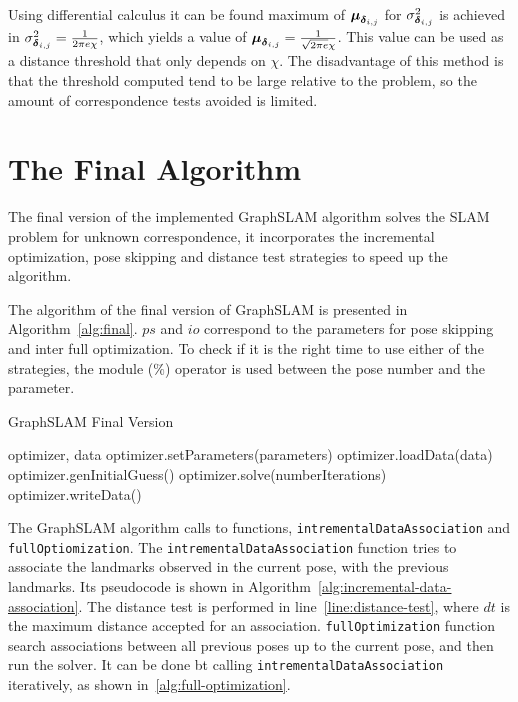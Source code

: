 Using differential calculus it can be found maximum of $\boldsymbol{\mu}_{\boldsymbol{\delta}_{i,j}}$ for $\sigma_{\boldsymbol{\delta}_{i,j}}^2$ is achieved in $\sigma_{\boldsymbol{\delta}_{i,j}}^2 = \frac{1}{2\pi e\chi}$, which yields a value of $\boldsymbol{\mu}_{\boldsymbol{\delta}_{i,j}} = \frac{1}{\sqrt{2\pi e}\chi}$.  
This value can be used as a  distance threshold that only depends on $\chi$. The disadvantage of this method is that the threshold computed tend to be large relative to the problem, so the amount of correspondence tests avoided is limited.


\section{The Final Algorithm}

The final version of the implemented GraphSLAM algorithm solves the SLAM problem for unknown correspondence, it incorporates the incremental optimization, pose skipping and  distance test strategies to speed up the algorithm.

The algorithm of the final version of GraphSLAM is presented in Algorithm~\ref{alg:final}. $ps$ and $io$ correspond to the parameters for pose skipping and inter full optimization. To check if it is the right time to use either of the strategies, the module ($\%$) operator is used between the pose number and the parameter. 

\begin{algorithm}[htbp!]
    \caption{GraphSLAM Final Version}
    \label{alg:final}
    \begin{algorithmic}[1]
        \Require optimizer, data
        \State optimizer.setParameters(parameters)
        \State optimizer.loadData(data)
        \State optimizer.genInitialGuess()
        \State
        \State {}
        \State optimizer.solve(numberIterations)
        \EndIf
        \State {}
        \EndIf
        \EndFor
        \State
        \State optimizer.writeData()
    \end{algorithmic}
\end{algorithm}

The GraphSLAM algorithm calls to functions, \texttt{intremental\-Data\-Association} and \texttt{full\-Optiomization}. The \texttt{intrementalDataAssociation} function tries to associate the landmarks observed in the current pose, with the previous landmarks. Its pseudocode is shown in Algorithm~\ref{alg:incremental-data-association}. The distance test is performed in line~\ref{line:distance-test}, where $dt$ is the maximum distance accepted for an association. \texttt{full\-Optimization} function search associations between all previous poses up to the current pose, and then run the solver. It can be done bt calling \texttt{intremental\-Data\-Association} iteratively, as shown in~\ref{alg:full-optimization}.

